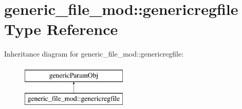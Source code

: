 \hypertarget{structgeneric__file__mod_1_1genericregfile}{}\section{generic\+\_\+file\+\_\+mod\+:\+:genericregfile Type Reference}
\label{structgeneric__file__mod_1_1genericregfile}
Inheritance diagram for generic\+\_\+file\+\_\+mod\+:\+:genericregfile\+:\begin{figure}[H]
\begin{center}
\leavevmode
\includegraphics[height=2.000000cm]{structgeneric__file__mod_1_1genericregfile}
\end{center}
\end{figure}
